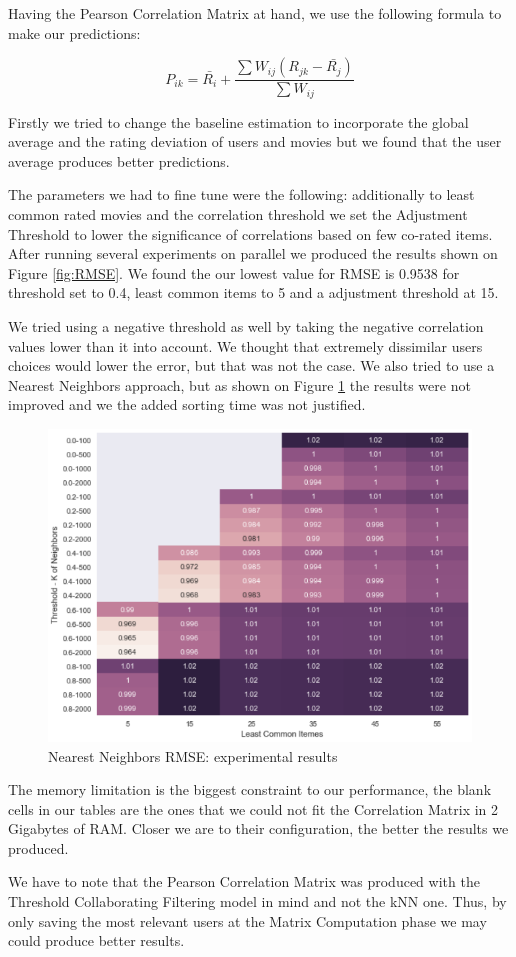 \documentclass[12pt]{article}
\begin{document}
Having the Pearson Correlation Matrix at hand, we use the following formula to make our predictions:

\[ P_{ik} = \bar{R_i}  + \frac{\sum{W_{ij}(R_{jk} - \bar{R_j})}}{\sum{W_{ij}}} \]

Firstly we tried to change the baseline estimation to incorporate the global average and the rating deviation of users and movies but we found that the user average produces better predictions.

The parameters we had to fine tune were the following: additionally to least  common rated movies and the correlation threshold we set the Adjustment Threshold to lower the significance of correlations based on few co-rated items. After running several experiments on parallel we produced the results shown on Figure \ref{fig:RMSE}. We found the our lowest value for RMSE is 0.9538 for threshold set to 0.4, least common items to 5 and a adjustment threshold at 15.

We tried using a negative threshold as well by taking the negative correlation values lower than it into account. We thought that extremely dissimilar users choices would lower the error, but that was not the case.
We also tried to use a Nearest Neighbors approach, but as shown on Figure \ref{fig:nnRMSE} the results were not improved and we the added sorting time was not justified. 

\begin{figure}[h]
    \centering
    \includegraphics[width=1\textwidth]{../nnrmse}
    \caption{Nearest Neighbors RMSE: experimental results}
    \label{fig:nnRMSE}
\end{figure}

The memory limitation is the biggest constraint to our performance, the blank cells in our tables are the ones that we could not fit the Correlation Matrix in 2 Gigabytes of RAM. Closer we are to their configuration, the better the results we produced.

We have to note that the Pearson Correlation Matrix was produced with the Threshold Collaborating Filtering model in mind and not the kNN one. Thus, by only saving the most relevant users at the Matrix Computation phase we may could produce better results.
\end{document}
